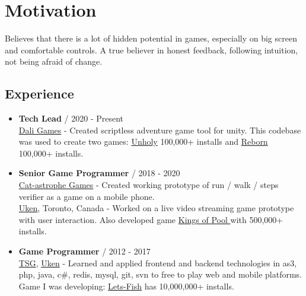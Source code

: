 \documentclass[12pt,a4paper]{article}
\begin{document}
\begin{multicols}{2}


\centering
\section*{ Motivation}
\justifying
Believes that there is a lot of hidden potential in games, especially on big screen and comfortable controls. A true believer in honest feedback, following intuition, not being afraid of change.

\begin{samepage}
\centering
\section*{Experience }
\begin{itemize}[leftmargin=*]
	\item \textbf{Tech Lead} / 2020 - Present \\
		{\href{https://dali.games/}{Dali Games}} - Created scriptless adventure game tool for unity. This codebase was used to create two games: {\href{https://play.google.com/store/apps/details?id=games.dali.adventure.neighborhood.unholy}{Unholy}} 100,000+ installs and {\href{https://play.google.com/store/apps/details?id=games.dali.adventure.reborn}{Reborn}} 100,000+ installs.   \\
	\item \textbf{Senior Game Programmer} / 2018 - 2020\\
		{\href{https://cat-astrophe-games.com/}{Cat-astrophe Games}} - Created working prototype of run / walk / steps verifier as a game on a mobile phone. \\
		{\href{https://www.uken.com/}{Uken}}, Toronto, Canada  - Worked on a live video streaming game prototype with user interaction. Also developed game {\href{https://play.google.com/store/apps/details?id=com.uken.pool}{Kings of Pool }} with  500,000+ installs.  \\
	\item \textbf{Game Programmer} / 2012 - 2017\\ 
		{\href{https://tensquaregames.com/}{TSG}}, {\href{https://www.uken.com/}{Uken}} - Learned and applied frontend and backend technologies in as3, php, java, c\#, redis, mysql, git, svn to free to play web and mobile platforms. Game I was developing: {\href{https://play.google.com/store/apps/details?id=air.com.tensquaregames.letsfish}{Lets-Fish}} has 10,000,000+ installs.    \\	 

\end{itemize}
\end{samepage}
\end{multicols}
\end{document}
